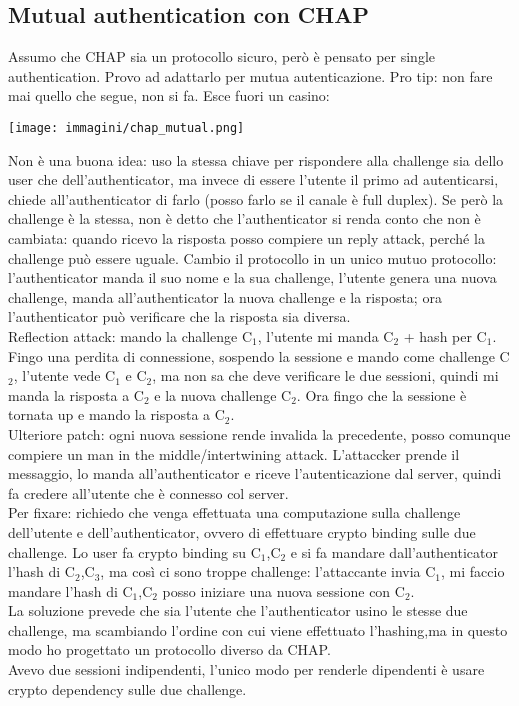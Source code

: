 \documentclass[16px]{article}
\begin{document}
\subsection{Mutual authentication con CHAP}
Assumo che CHAP sia un protocollo sicuro, però è pensato per single authentication. Provo ad adattarlo per mutua autenticazione. Pro tip: non fare mai quello che segue, non si fa. Esce fuori un casino:
\begin{center}
\texttt{[image: immagini/chap\_mutual.png]}
\end{center}
Non è una buona idea: uso la stessa chiave per rispondere alla challenge sia dello user che dell'authenticator, ma invece di essere l'utente il primo ad autenticarsi, chiede all'authenticator di farlo (posso farlo se il canale è full duplex). Se però la challenge è la stessa, non è detto che l'authenticator si renda conto che non è cambiata: quando ricevo la risposta posso compiere un reply attack, perché la challenge può essere uguale. Cambio il protocollo in un unico mutuo protocollo: l'authenticator manda il suo nome e la sua challenge, l'utente genera una nuova challenge, manda all'authenticator la nuova challenge e la risposta; ora l'authenticator può verificare che la risposta sia diversa.\\ Reflection attack: mando la challenge C$_{1}$, l'utente mi manda C$_{2}$ + hash per C$_{1}$. Fingo una perdita di connessione, sospendo la sessione e mando come challenge C$_{2}$, l'utente vede C$_{1}$ e C$_{2}$, ma non sa che deve verificare le due sessioni, quindi mi manda la risposta a C$_{2}$ e la nuova challenge C$_{2}$. Ora fingo che la sessione è tornata up e mando la risposta a C$_{2}$.\\ Ulteriore patch: ogni nuova sessione rende invalida la precedente, posso comunque compiere un man in the middle/intertwining attack. L'attaccker prende il messaggio, lo manda all'authenticator e riceve l'autenticazione dal server, quindi fa credere all'utente che è connesso col server.\\ Per fixare: richiedo che venga effettuata una computazione sulla challenge dell'utente e dell'authenticator, ovvero di effettuare crypto binding sulle due challenge. Lo user fa crypto binding su C$_{1}$,C$_{2}$ e si fa mandare dall'authenticator l'hash di C$_{2}$,C$_{3}$, ma così ci sono troppe challenge: l'attaccante invia C$_{1}$, mi faccio mandare l'hash di C$_{1}$,C$_{2}$ posso iniziare una nuova sessione con C$_{2}$.\\ La soluzione prevede che sia l'utente che l'authenticator usino le stesse due challenge, ma scambiando l'ordine con cui viene effettuato l'hashing,ma in questo modo ho progettato un protocollo diverso da CHAP.\\ Avevo due sessioni indipendenti, l'unico modo per renderle dipendenti è usare crypto dependency sulle due challenge.
\end{document}
